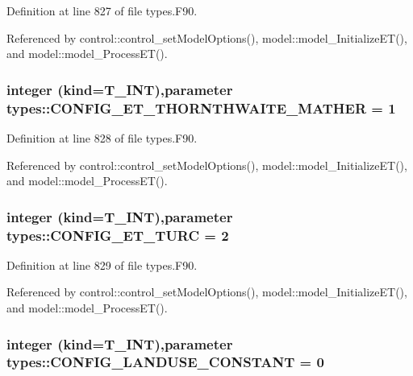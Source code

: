 Definition at line 827 of file types.F90.



Referenced by control::control\_\-setModelOptions(), model::model\_\-InitializeET(), and model::model\_\-ProcessET().

\hypertarget{namespacetypes_aa1f3f7bad7912d092d9b1a8f726e4f47}{
\subsubsection[{CONFIG\_\-ET\_\-THORNTHWAITE\_\-MATHER}]{\setlength{\rightskip}{0pt plus 5cm}integer (kind={\bf T\_\-INT}),parameter {\bf types::CONFIG\_\-ET\_\-THORNTHWAITE\_\-MATHER} = 1}}
\label{namespacetypes_aa1f3f7bad7912d092d9b1a8f726e4f47}


Definition at line 828 of file types.F90.



Referenced by control::control\_\-setModelOptions(), model::model\_\-InitializeET(), and model::model\_\-ProcessET().

\hypertarget{namespacetypes_a402a872e6930d08699d8371bd68f0247}{
\subsubsection[{CONFIG\_\-ET\_\-TURC}]{\setlength{\rightskip}{0pt plus 5cm}integer (kind={\bf T\_\-INT}),parameter {\bf types::CONFIG\_\-ET\_\-TURC} = 2}}
\label{namespacetypes_a402a872e6930d08699d8371bd68f0247}


Definition at line 829 of file types.F90.



Referenced by control::control\_\-setModelOptions(), model::model\_\-InitializeET(), and model::model\_\-ProcessET().

\hypertarget{namespacetypes_a1bc536b5292ca49354232a3d23eb7e79}{
\subsubsection[{CONFIG\_\-LANDUSE\_\-CONSTANT}]{\setlength{\rightskip}{0pt plus 5cm}integer (kind={\bf T\_\-INT}),parameter {\bf types::CONFIG\_\-LANDUSE\_\-CONSTANT} = 0}}
\label{namespacetypes_a1bc536b5292ca49354232a3d23eb7e79}


